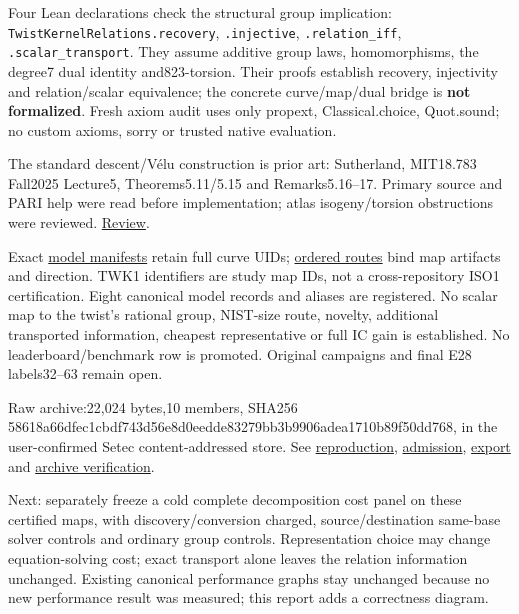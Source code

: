 \documentclass[
  10pt,
]{article}
\begin{document}
Four Lean declarations check the structural group implication:
\texttt{TwistKernelRelations.recovery}, \texttt{.injective},
\texttt{.relation\_iff}, \texttt{.scalar\_transport}. They assume
additive group laws, homomorphisms, the degree7 dual identity
and823-torsion. Their proofs establish recovery, injectivity and
relation/scalar equivalence; the concrete curve/map/dual bridge is
\textbf{not formalized}. Fresh axiom audit uses only propext,
Classical.choice, Quot.sound; no custom axioms, sorry or trusted native
evaluation.

The standard descent/Vélu construction is prior art: Sutherland,
MIT18.783 Fall2025 Lecture5, Theorems5.11/5.15 and Remarks5.16--17.
Primary source and PARI help were read before implementation; atlas
isogeny/torsion obstructions were reviewed.
\href{../../execution-v8/LITERATURE.md}{Review}.

Exact \href{../../execution-v8/EC1_MODELS.json}{model manifests} retain
full curve UIDs; \href{../../execution-v8/ORDERED_ROUTES.json}{ordered
routes} bind map artifacts and direction. TWK1 identifiers are study map
IDs, not a cross-repository ISO1 certification. Eight canonical model
records and aliases are registered. No scalar map to the twist's
rational group, NIST-size route, novelty, additional transported
information, cheapest representative or full IC gain is established. No
leaderboard/benchmark row is promoted. Original campaigns and final E28
labels32--63 remain open.

Raw archive:22,024 bytes,10 members, SHA256
58618a66\allowbreak{}dfec1cbd\allowbreak{}f743d56e\allowbreak{}8d0eedde\allowbreak{}83279bb3\allowbreak{}b9906ade\allowbreak{}a1710b89\allowbreak{}f50dd768, in the
user-confirmed Setec content-addressed store. See
\href{../../execution-v8/README.md}{reproduction},
\href{../../execution-v8/ADMISSION.json}{admission},
\href{../../execution-v8/experiment.export.json}{export} and
\href{../../execution-v8/RAW_VERIFICATION.json}{archive verification}.

Next: separately freeze a cold complete decomposition cost panel on
these certified maps, with discovery/conversion charged,
source/destination same-base solver controls and ordinary group
controls. Representation choice may change equation-solving cost; exact
transport alone leaves the relation information unchanged. Existing
canonical performance graphs stay unchanged because no new performance
result was measured; this report adds a correctness diagram.
\end{document}
